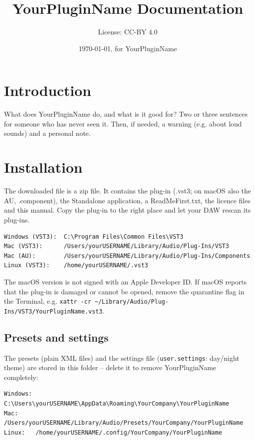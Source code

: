 \documentclass[12pt]{article}
\title{YourPluginName Documentation}
\author{License: CC-BY 4.0}
\date{\today, for YourPluginName \pluginversion}
\begin{document}
\maketitle

\section{Introduction}
What does YourPluginName do, and what is it good for? Two or three sentences for someone who
has never seen it. Then, if needed, a warning (e.g. about loud sounds) and a personal note.

\section{Installation}
The downloaded file is a zip file. It contains the plug-in (.vst3; on macOS also the AU,
.component), the Standalone application, a ReadMeFirst.txt, the licence files and this manual.
Copy the plug-in to the right place and let your DAW rescan its plug-ins.

\begin{verbatim}
Windows (VST3):  C:\Program Files\Common Files\VST3
Mac (VST3):      /Users/yourUSERNAME/Library/Audio/Plug-Ins/VST3
Mac (AU):        /Users/yourUSERNAME/Library/Audio/Plug-Ins/Components
Linux (VST3):    /home/yourUSERNAME/.vst3
\end{verbatim}

The macOS version is not signed with an Apple Developer ID. If macOS reports that the plug-in
is damaged or cannot be opened, remove the quarantine flag in the Terminal, e.g.
\texttt{xattr -cr \textasciitilde/Library/Audio/Plug-Ins/VST3/YourPluginName.vst3}.

\subsection{Presets and settings}
The presets (plain XML files) and the settings file (\texttt{user.settings}: day/night theme)
are stored in this folder -- delete it to remove YourPluginName completely:
\begin{verbatim}
Windows: C:\Users\yourUSERNAME\AppData\Roaming\YourCompany\YourPluginName
Mac:     /Users/yourUSERNAME/Library/Audio/Presets/YourCompany/YourPluginName
Linux:   /home/yourUSERNAME/.config/YourCompany/YourPluginName
\end{verbatim}
\end{document}
